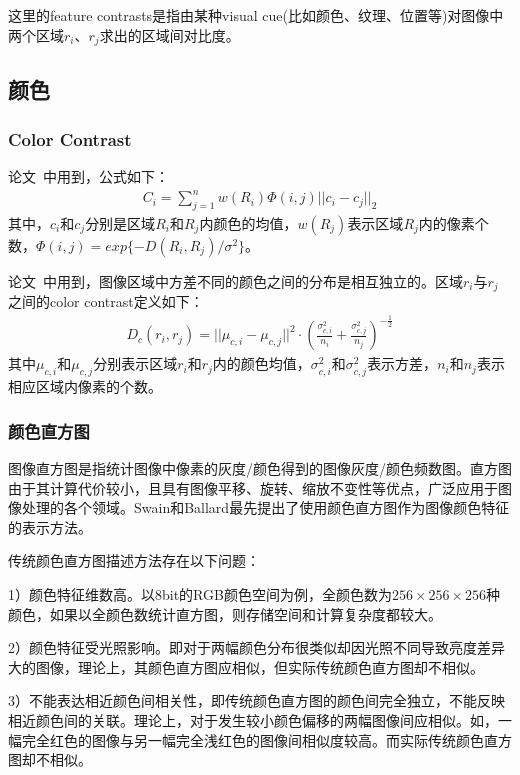 \documentclass[12pt]{article}
\begin{document}
这里的feature contrasts是指由某种visual cue(比如颜色、纹理、位置等)对图像中两个区域$r_i$、$r_j$求出的区域间对比度。

\subsection{颜色}

\subsubsection{Color Contrast}

论文~\cite{yan2013hierarchical}中用到，公式如下：
\begin{align}
C_i = \sum_{j=1}^{n}w(R_i)\Phi(i, j)||c_i-c_j||_2
\end{align}
其中，$c_i$和$c_j$分别是区域$R_i$和$R_j$内颜色的均值，$w(R_j)$表示区域$R_j$内的像素个数，$\Phi(i, j) = exp\{ -D(R_i, R_j)/\sigma^2\}$。

论文~\cite{zhu2014tag}中用到，图像区域中方差不同的颜色之间的分布是相互独立的。区域$r_i$与$r_j$之间的color contrast定义如下：
\begin{align}
D_c(r_i, r_j) = ||\mu_{c, i}-\mu_{c, j}||^2\cdot \left(\frac{\sigma_{c, i}^2}{n_i}+\frac{\sigma_{c, j}^2}{n_j}\right)^{-\frac{1}{2}}
\end{align}
其中$\mu_{c, i}$和$\mu_{c, j}$分别表示区域$r_i$和$r_j$内的颜色均值，$\sigma_{c, i}^2$和$\sigma_{c, j}^2$表示方差，$n_i$和$n_j$表示相应区域内像素的个数。

\subsubsection{颜色直方图}

图像直方图是指统计图像中像素的灰度/颜色得到的图像灰度/颜色频数图。直方图由于其计算代价较小，且具有图像平移、旋转、缩放不变性等优点，广泛应用于图像处理的各个领域。Swain和Ballard最先提出了使用颜色直方图作为图像颜色特征的表示方法。

传统颜色直方图描述方法存在以下问题：

1）颜色特征维数高。以8bit的RGB颜色空间为例，全颜色数为$256 \times 256 \times 256$种颜色，如果以全颜色数统计直方图，则存储空间和计算复杂度都较大。

2）颜色特征受光照影响。即对于两幅颜色分布很类似却因光照不同导致亮度差异大的图像，理论上，其颜色直方图应相似，但实际传统颜色直方图却不相似。

3）不能表达相近颜色间相关性，即传统颜色直方图的颜色间完全独立，不能反映相近颜色间的关联。理论上，对于发生较小颜色偏移的两幅图像间应相似。如，一幅完全红色的图像与另一幅完全浅红色的图像间相似度较高。而实际传统颜色直方图却不相似。
\end{document}
